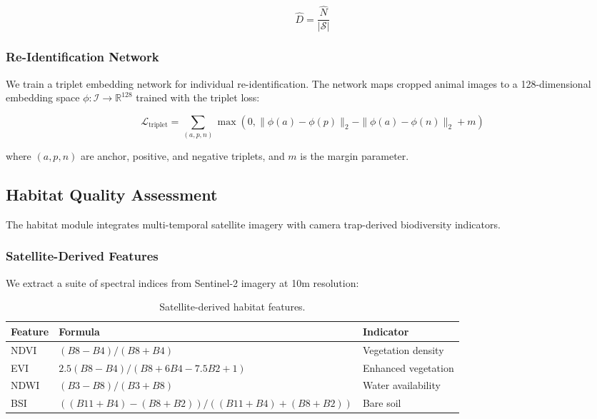 \documentclass[11pt,letterpaper]{article}
\begin{document}
\begin{equation}
\hat{D} = \frac{\hat{N}}{|\mathcal{S}|}
\end{equation}

\subsubsection{Re-Identification Network}

We train a triplet embedding network for individual re-identification. The network maps cropped animal images to a 128-dimensional embedding space $\phi: \mathcal{I} \to \mathbb{R}^{128}$ trained with the triplet loss:

\begin{equation}
\mathcal{L}_{\text{triplet}} = \sum_{(a,p,n)} \max\left(0, \|\phi(a) - \phi(p)\|_2 - \|\phi(a) - \phi(n)\|_2 + m\right)
\end{equation}

where $(a, p, n)$ are anchor, positive, and negative triplets, and $m$ is the margin parameter.

\subsection{Habitat Quality Assessment}

The habitat module integrates multi-temporal satellite imagery with camera trap-derived biodiversity indicators.

\subsubsection{Satellite-Derived Features}

We extract a suite of spectral indices from Sentinel-2 imagery at 10m resolution:

\begin{table}[htbp]
\centering
\caption{Satellite-derived habitat features.}
\label{tab:sat_features}
\begin{tabular}{lll}
\toprule
\textbf{Feature} & \textbf{Formula} & \textbf{Indicator} \\
\midrule
NDVI & $(B8 - B4)/(B8 + B4)$ & Vegetation density \\
EVI & $2.5(B8 - B4)/(B8 + 6B4 - 7.5B2 + 1)$ & Enhanced vegetation \\
NDWI & $(B3 - B8)/(B3 + B8)$ & Water availability \\
BSI & $((B11+B4)-(B8+B2))/((B11+B4)+(B8+B2))$ & Bare soil \\
\bottomrule
\end{tabular}
\end{table}
\end{document}
